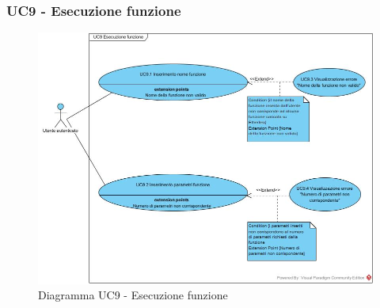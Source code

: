 \subsubsection{UC9 - Esecuzione funzione}
\begin{figure}[h]
	\centering
	\includegraphics[width=\linewidth]{res/img/UC9.jpg}
	\caption{Diagramma UC9 - Esecuzione funzione}
\end{figure}
